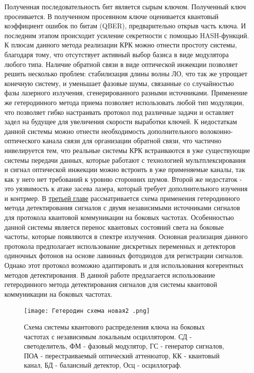 Полученная последовательность бит является сырым ключом. Полученный ключ просеивается. В полученном просеянном ключе оценивается квантовый коэффициент ошибок по битам (QBER), предварительно открыв часть ключа. И последним этапом происходит усиление секретности  с помощью HASH-функций.
\newline К плюсам данного метода реализации КРК можно отнести простоту системы, благодаря тому, что отсутствует активный выбор базиса в виде модулятора любого типа. Наличие обратной связи в виде оптической инжекции позволяет решить несколько проблем: стабилизация длины волны ЛО, что так же упрощает конечную систему, и уменьшает фазовые шумы, связанные со случайностью фазы лазерного излучения, сгенерированного разными источниками. Применение же гетеродинного метода приема позволяет использовать любой тип модуляции, что позволяет гибко настраивать протокол под различные задачи и оставляет задел на будущее для увеличения скорости выработки ключей.
\newline К недостаткам данной системы можно отнести необходимость дополнительного волоконно-оптического канала связи для организации обратной связи, что частично нивелируется тем, что реальные системы КРК встраиваются в уже существующие системы передачи данных, которые работают с технологией мультплексирования и сигнал оптической инжекции можно встроить в уже применяемые каналы, так как у него нет требований к уровню сторонних шумов. Второй же недостаток - это уязвимость к атаке засева лазера, который требует дополнительного изучения и контрмер. 
\newpage В \underline{третьей главе} рассматривается схема применения гетеродинного метода детектирования \cite{brunner2017,delange1968,kuri2003} сигналов с двумя независимыми источниками сигналов \cite{hajomer2024,shao2022} для протокола квантовой коммуникации на боковых частотах. Особенностью данной системы является перенос квантовых состояний света на боковые частоты, которые появляются в спектре излучения. Основная реализация данного протокола предполагает использование дискретных переменных и детекторов одиночных фотонов на основе лавинных фотодиодов для регистрации сигналов. Однако этот протокол возможно адаптировать и для использования когерентных методов детектирования\cite{samsonov2021,fadeev2024}. 
\newline В данной работе предлагается использование гетеродинного метода детектирования сигналов для системы квантовой коммуникации на боковых частотах.
\begin{figure}
    \centering
    \texttt{[image: Гетеродин схема новая2 .png]}
    \caption{Схема системы квантового распределения ключа на боковых частотах с независимым локальным осциллятором. СД - светоделитель, ФМ - фазовый модулятор, ГС - генератор сигналов, ПОА - перестраиваемый оптический аттенюатор, КК - квантовый канал, БД - балансный детектор, Осц - осциллограф.}
    \label{fig:het true scheme}
\end{figure}
